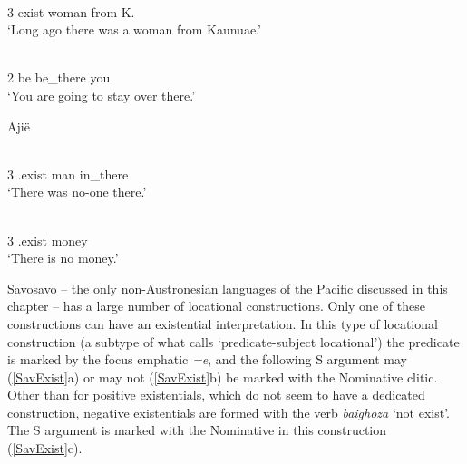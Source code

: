 
\begin{exe} \citep[110]{Lichtenberk:1978}\nopagebreak[4]
\begin{xlist}
\ex\label{AjiExHum}\gll{}   \textbf{} \textbf{}  \\
3\sg{} exist \pstrem{} \nom{} woman from K.\\
\glt `Long ago there was a woman from Kaunuae.'

\ex\label{AijLoc}\gll{}    \textbf{} \textbf{}\\
2\sg{} \prosp{} be be\_there \nom{} you\\
\glt `You are going to stay over there.'
\end{xlist}
\end{exe}

\begin{exe}\ex\label{AijLoc2} {Aji\"e} \citep[110]{Lichtenberk:1978}\nopagebreak[4]
\begin{xlist}
\ex\gll{}  \textbf{} \\
3\sg{} \Neg{}.exist man in\_there\\
\glt `There was no-one there.' 

\ex\gll{}  \textbf{}\\
3\sg{} \Neg{}.exist money\\
\glt `There is no money.'
\end{xlist}
\end{exe}

Savosavo -- the only non-Austronesian languages of the Pacific discussed in this chapter -- has a large number of locational constructions. 
Only one of these constructions can have an existential interpretation. 
In this type of locational construction (a subtype of what \citet{Wegener:2008} calls `predicate-subject locational') the predicate is marked by the focus emphatic \emph{=e}, and the following S argument may (\ref{SavExist}a) or may not (\ref{SavExist}b) be marked with the Nominative clitic.
Other than for positive existentials, which do not seem to have a dedicated construction, negative existentials are formed with the verb \emph{baighoza} `not exist'. 
The S argument is marked with the Nominative in this construction (\ref{SavExist}c).

